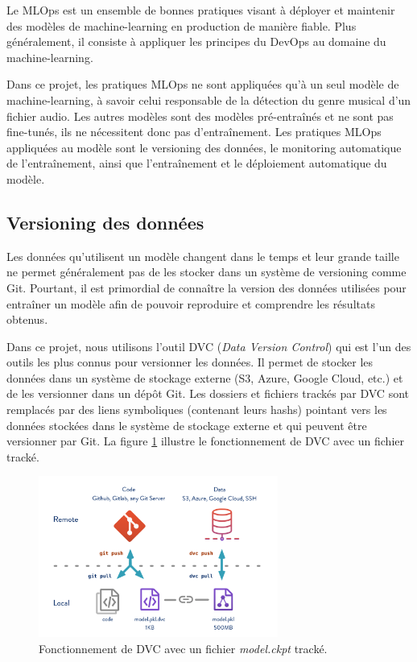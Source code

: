 Le MLOps est un ensemble de bonnes pratiques visant à déployer et maintenir des modèles de machine-learning en production de manière fiable. Plus généralement, il consiste à appliquer les principes du DevOps au domaine du machine-learning. 

Dans ce projet, les pratiques MLOps ne sont appliquées qu'à un seul modèle de machine-learning, à savoir celui responsable de la détection du genre musical d'un fichier audio. Les autres modèles sont des modèles pré-entraînés et ne sont pas fine-tunés, ils ne nécessitent donc pas d'entraînement. Les pratiques MLOps appliquées au modèle sont le versioning des données, le monitoring automatique de l'entraînement, ainsi que l'entraînement et le déploiement automatique du modèle.

\subsection{Versioning des données}

Les données qu'utilisent un modèle changent dans le temps et leur grande taille ne permet généralement pas de les stocker dans un système de versioning comme Git. Pourtant, il est primordial de connaître la version des données utilisées pour entraîner un modèle afin de pouvoir reproduire et comprendre les résultats obtenus.

Dans ce projet, nous utilisons l'outil DVC (\textit{Data Version Control}) \cite{dvc} qui est l'un des outils les plus connus pour versionner les données. Il permet de stocker les données dans un système de stockage externe (S3, Azure, Google Cloud, etc.) et de les versionner dans un dépôt Git. Les dossiers et fichiers trackés par DVC sont remplacés par des liens symboliques (contenant leurs hashs) pointant vers les données stockées dans le système de stockage externe et qui peuvent être versionner par Git. La figure \ref{fig:dvc} illustre le fonctionnement de DVC avec un fichier tracké.

\begin{figure}[H]
    \centering
    \includegraphics[width=0.7\textwidth]{rsc/git-dvc.png}
    \caption{Fonctionnement de DVC avec un fichier \textit{model.ckpt} tracké.}
    \label{fig:dvc}
\end{figure}

